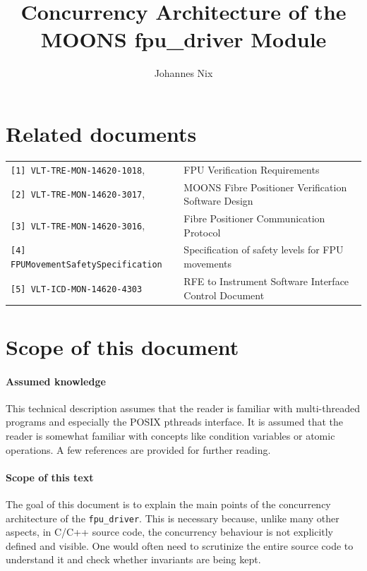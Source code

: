 \documentclass[fontsize=12,a4paper]{scrartcl}
\begin{document}
\title{Concurrency Architecture of the MOONS fpu\_driver Module}


\author{Johannes Nix}

\maketitle

\tableofcontents

\section{Related documents}

\begin{tabular}{|ll|}
  \hline
\verb+[1] VLT-TRE-MON-14620-1018+, &  FPU Verification Requirements \\
\verb+[2] VLT-TRE-MON-14620-3017+, & MOONS Fibre Positioner Verification Software Design \\
\verb+[3] VLT-TRE-MON-14620-3016+, & Fibre Positioner Communication Protocol\\
\verb+[4] FPUMovementSafetySpecification+ & Specification of safety levels for FPU movements\\
\verb+[5] VLT-ICD-MON-14620-4303+ & RFE to Instrument Software Interface Control Document \\
\hline
\end{tabular}


\section{Scope of this document}

\paragraph{Assumed knowledge} This technical description
assumes that the reader is familiar with multi-threaded programs and
especially the POSIX pthreads interface. It is assumed that the reader
is somewhat familiar with concepts like condition variables or atomic
operations.  A few references are provided for further reading.


\paragraph{Scope of this text} The goal of this document is to explain the main points of the
concurrency architecture of the \texttt{fpu\_driver}.  This is
necessary because, unlike many other aspects, in C/C++ source code,
the concurrency behaviour is not explicitly defined and visible.  One
would often need to scrutinize the entire source code to understand it
and check whether invariants are being kept.
\end{document}
